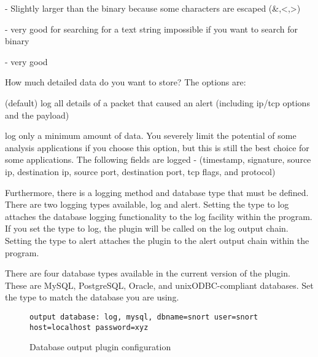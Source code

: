 \documentclass[english]{report}
\begin{document}
\begin{description}{}
\begin{description}{}
\begin{description}{}
\item [storage~requirements]- Slightly larger than the binary because
some characters are escaped (\&,<,>)
\item [searchability]- very good for searching for a text string impossible
if you want to search for binary 
\item [human~readability]- very good
\end{description}
\end{description}
\item [detail]How much detailed data do you want to store? The options
are:

\begin{description}{}
\item [full](default) log all details of a packet that caused an alert
(including ip/tcp options and the payload)
\item [fast]log only a minimum amount of data. You severely limit the potential
of some analysis applications if you choose this option, but this
is still the best choice for some applications. The following fields
are logged - (timestamp, signature, source ip, destination ip, source
port, destination port, tcp flags, and protocol)
\end{description}
\end{description}
Furthermore, there is a logging method and database type that must
be defined. There are two logging types available, log and alert.
Setting the type to log attaches the database logging functionality
to the log facility within the program. If you set the type to log,
the plugin will be called on the log output chain. Setting the type
to alert attaches the plugin to the alert output chain within the
program.

There are four database types available in the current version of
the plugin. These are MySQL, PostgreSQL, Oracle, and unixODBC-compliant
databases. Set the type to match the database you are using.

%
\begin{figure}[!hbpt]
\begin{verbatim}
output database: log, mysql, dbname=snort user=snort host=localhost password=xyz
\end{verbatim}

\caption{\label{database output config}Database output plugin configuration}
\end{figure}
\end{document}
